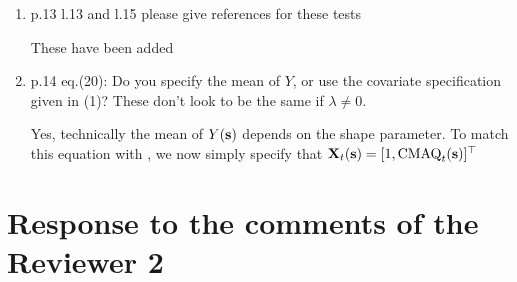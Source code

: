 \documentclass[11pt]{article}
\begin{document}
\begin{enumerate}[1.]
  \item p.13 l.13 and l.15 please give references for these tests \\

  \begin{response}
    These have been added
  \end{response}

  \item p.14 eq.(20): Do you specify the mean of $Y$, or use the covariate specification given in (1)? These don’t look to be the same if $\lambda \neq 0$. \\

  \begin{response}
    Yes, technically the mean of $Y(\mbox{\bf s})$ depends on the shape parameter.
    To match this equation with , we now simply specify that $\mbox{\bf X}_t(\mbox{\bf s}) = [1, \text{CMAQ}_t(\mbox{\bf s})]^\top$
  \end{response}
\end{enumerate}

\newpage
\section*{Response to the comments of the Reviewer 2}
\end{document}
